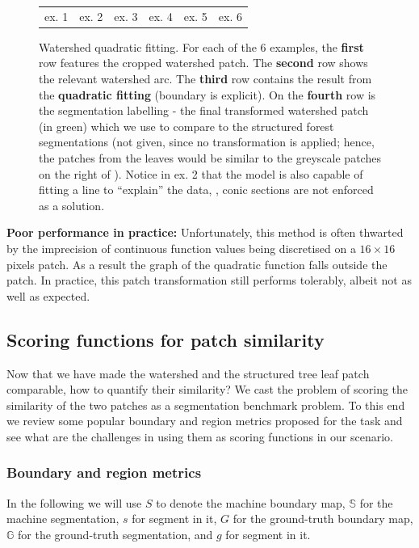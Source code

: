\begin{figure}[t]
\begin{center}
\begin{tabular}{ c c c c c c }
  ex. 1 & ex. 2 & ex. 3 & ex. 4 & ex. 5 & ex. 6 \\
  \end{tabular}
\end{center}
\caption[Watershed quadratic fitting]{Watershed quadratic fitting. For each of the 6 examples, the {\bf first} row features the cropped watershed patch. The {\bf second} row shows the relevant watershed arc. The {\bf third} row contains the result from the {\bf quadratic fitting} (boundary is explicit). On the {\bf fourth} row is the segmentation labelling - the final transformed watershed patch (in green) which we use to compare to the structured forest segmentations (not given, since no transformation is applied; hence, the patches from the leaves would be similar to the greyscale patches on the right of ). Notice in ex. 2 that the model is also capable of fitting a line to ``explain'' the data, \ie, conic sections are not enforced as a solution.}
\label{fig:ws-quadratic-fitting}
\end{figure}

\textbf{Poor performance in practice:} Unfortunately, this method is often thwarted by the imprecision of continuous function values being discretised on a $16\times 16$ pixels patch. %
As a result the graph of the quadratic function falls outside the patch. In practice, this patch transformation still performs tolerably, %
albeit not as well as expected.

\subsection{Scoring functions for patch similarity}
Now that we have made the watershed and the structured tree leaf patch comparable, how to quantify their similarity? 
We cast the problem of scoring the similarity of the two patches as a segmentation benchmark problem. To this end we review some popular boundary and region metrics proposed for the task and see what are the challenges in using them as scoring functions in our scenario.

\subsubsection{Boundary and region metrics}
\label{sec:ch4-boundary-and-region-metrics-maths}
In the following we will use $S$ to denote the machine boundary map, $\mathbb{S}$ for the machine segmentation, $s$ for segment in it, $G$ for the ground-truth boundary map, $\mathbb{G}$ for the ground-truth segmentation, and $g$ for segment in it. %

